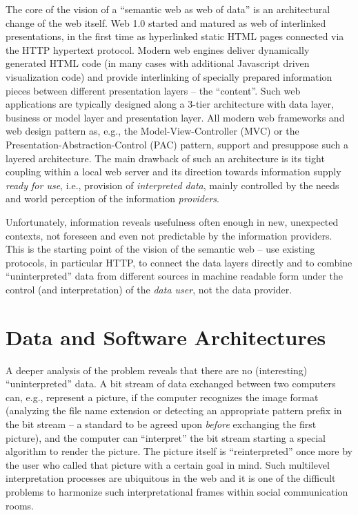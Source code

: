 \documentclass{llncs}
\begin{document}
The core of the vision of a ``semantic web as web of data'' is an
architectural change of the web itself. Web 1.0 started and matured as web of
interlinked presentations, in the first time as hyperlinked static HTML pages
connected via the HTTP hypertext protocol. Modern web engines deliver
dynamically generated HTML code (in many cases with additional Javascript
driven visualization code) and provide interlinking of specially prepared
information pieces between different presentation layers -- the ``content''.
Such web applications are typically designed along a 3-tier architecture with
data layer, business or model layer and presentation layer.  All modern web
frameworks and web design pattern as, e.g., the Model-View-Controller (MVC) or
the Presentation-Abstraction-Control (PAC) pattern, support and presuppose
such a layered architecture.  The main drawback of such an architecture is its
tight coupling within a local web server and its direction towards information
supply \emph{ready for use}, i.e., provision of \emph{interpreted data},
mainly controlled by the needs and world perception of the information
\emph{providers}.

Unfortunately, information reveals usefulness often enough in new, unexpected
contexts, not foreseen and even not predictable by the information
provi\-ders.  This is the starting point of the vision of the semantic web --
use existing protocols, in particular HTTP, to connect the data layers
directly and to combine ``uninterpreted'' data from different sources in
machine readable form under the control (and interpretation) of the \emph{data
  user}, not the data provider.

\section{Data and Software Architectures}

A deeper analysis of the problem reveals that there are no (interesting)
``uninterpreted'' data. A bit stream of data exchanged between two computers
can, e.g., represent a picture, if the computer recognizes the image format
(analyzing the file name extension or detecting an appropriate pattern prefix
in the bit stream -- a standard to be agreed upon \emph{before} exchanging the
first picture), and the computer can ``interpret'' the bit stream starting a
special algorithm to render the picture.  The picture itself is
``reinterpreted'' once more by the user who called that picture with a certain
goal in mind. Such multilevel interpretation processes are ubiquitous in the
web and it is one of the difficult problems to harmonize such interpretational
frames within social communication rooms.
\end{document}
